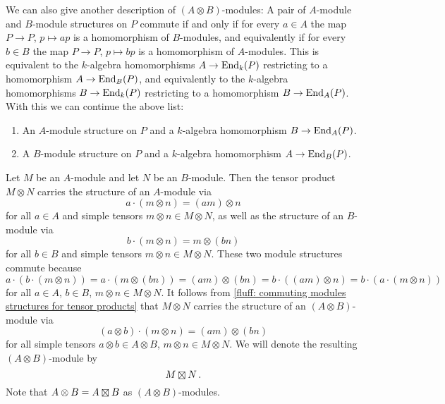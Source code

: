 \begin{fluff}
  We can also give another description of $(A \otimes B)$-modules:
  A pair of $A$-module and $B$-module structures on $P$ commute if and only if for every $a \in A$ the map $P \to P$, $p \mapsto ap$ is a homomorphism of $B$-modules, and equivalently if for every $b \in B$ the map $P \to P$, $p \mapsto bp$ is a homomorphism of $A$-modules.
  This is equivalent to the $k$-algebra homomorphisms $A \to \operatorname{End}_k(P)$ restricting to a homomorphism $A \to \operatorname{End}_B(P)$, and equivalently to the $k$-algebra homomorphisms $B \to \operatorname{End}_k(P)$ restricting to a homomorphism $B \to \operatorname{End}_A(P)$.
  With this we can continue the above list:
  \begin{enumerate}[resume]
    \item
      An $A$-module structure on $P$ and a $k$-algebra homomorphism $B \to \operatorname{End}_A(P)$.
    \item
      A $B$-module structure on $P$ and a $k$-algebra homomorphism $A \to \operatorname{End}_B(P)$.
  \end{enumerate}
\end{fluff}


\begin{fluff}
  \label{fluff: construction of boxtimes}
  Let $M$ be an $A$-module and let $N$ be an $B$-module.
  Then the tensor product $M \otimes N$ carries the structure of an $A$-module via
  \[
      a \cdot (m \otimes n)
    = (am) \otimes n
  \]
  for all $a \in A$ and simple tensors $m \otimes n \in M \otimes N$, as well as the structure of an $B$-module via
  \[
      b \cdot (m \otimes n)
    = m \otimes (bn)
  \]
  for all $b \in B$ and simple tensors $m \otimes n \in M \otimes N$.
  These two module structures commute because
  \[
      a \cdot (b \cdot (m \otimes n))
    = a \cdot (m \otimes (bn))
    = (am) \otimes (bn)
    = b \cdot ((am) \otimes n)
    = b \cdot (a \cdot (m \otimes n))
  \]
  for all $a \in A$, $b \in B$, $m \otimes n \in M \otimes N$.
  It follows from \ref{fluff: commuting modules structures for tensor products} that $M \otimes N$ carries the structure of an $(A \otimes B)$-module via
  \[
      (a \otimes b) \cdot (m \otimes n)
    = (am) \otimes (bn)
  \]
  for all simple tensors $a \otimes b \in A \otimes B$, $m \otimes n \in M \otimes N$.
  We will denote the resulting $(A \otimes B)$-module by
  \[
    M \outertensor N \,.
  \]
  Note that $A \otimes B = A \outertensor B$ as $(A \otimes B)$-modules.
\end{fluff}


